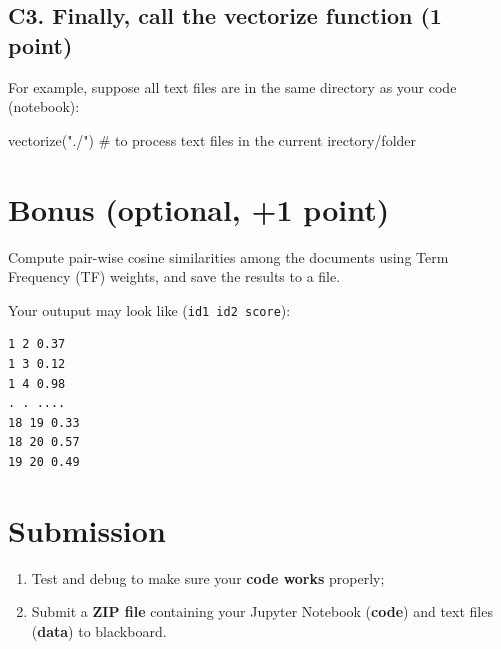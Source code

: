 \documentclass[
  letterpaper,
]{scrbook}
\newenvironment{Shaded}{\begin{snugshade}}{\end{snugshade}}
\newcommand{\CommentTok}[1]{\textcolor[rgb]{0.37,0.37,0.37}{#1}}
\newcommand{\NormalTok}[1]{\textcolor[rgb]{0.00,0.23,0.31}{#1}}
\newcommand{\StringTok}[1]{\textcolor[rgb]{0.13,0.47,0.30}{#1}}
\providecommand{\tightlist}{%
  \setlength{\itemsep}{0pt}\setlength{\parskip}{0pt}}
\begin{document}
\subsection*{C3. Finally, call the vectorize function (1
point)}\label{c3.-finally-call-the-vectorize-function-1-point}

For example, suppose all text files are in the same directory as your
code (notebook):

\begin{Shaded}
\begin{Highlighting}[]
\NormalTok{vectorize(}\StringTok{"./"}\NormalTok{)    }\CommentTok{\# to process text files in the current irectory/folder}
\end{Highlighting}
\end{Shaded}

\section*{Bonus (optional, +1 point)}\label{bonus-optional-1-point}


Compute pair-wise cosine similarities among the documents using Term
Frequency (TF) weights, and save the results to a file.

Your outuput may look like (\texttt{id1\ id2\ score}):

\begin{verbatim}
1 2 0.37
1 3 0.12
1 4 0.98
. . ....
18 19 0.33
18 20 0.57
19 20 0.49
\end{verbatim}

\section*{Submission}\label{submission}


\begin{enumerate}
\def\labelenumi{\arabic{enumi}.}
\tightlist
\item
  Test and debug to make sure your \textbf{code works} properly;
\item
  Submit a \textbf{ZIP file} containing your Jupyter Notebook
  (\textbf{code}) and text files (\textbf{data}) to blackboard.
\end{enumerate}
\end{document}
